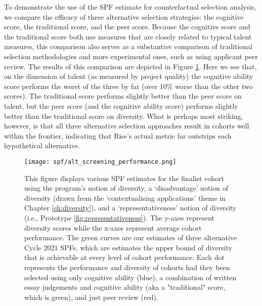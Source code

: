 To demonstrate the use of the SPF estimate for counterfactual selection analysis, we compare the efficacy of three alternative selection strategies: the cognitive score, the traditional score, and the peer score. Because the cognitive score and the traditional score both use measures that are closely related to typical talent measures, this comparison also serves as a substantive comparison of traditional selection methodologies and more experimental ones, such as using applicant peer review. The results of this comparison are depicted in Figure \ref{fig:alt_screen}. Here we see that, on the dimension of talent (as measured by project quality) the cognitive ability score performs the worst of the three by far (over $10\%$ worse than the other two scores). The traditional score performs slightly better than the peer score on talent, but the peer score (and the cognitive ability score) performs slightly better than the traditional score on diversity. What is perhaps most striking, however, is that all three alternative selection approaches result in cohorts well within the frontier, indicating that Rise's actual metric far outstrips each hypothetical alternative.

    \begin{figure}[!htb]
    \centering
    \texttt{[image: spf/alt\_screening\_performance.png]} 
    \caption{This figure displays various SPF estimates for the  finalist cohort using the program's notion of diversity, a `disadvantage' notion of diversity (drawn from the `contextualising applications' theme in Chapter \ref{ch:diversity}), and a `representativeness' notion of diversity (i.e., Prototype \ref{fig:representativeness}). The y-axes represent diversity scores while the x-axes represent average cohort performance. The green curves are our estimates of three alternative Cycle 2021 SPFs, which are estimates the upper bound of diversity that is achievable at every level of cohort performance. Each dot represents the performance and diversity of cohorts had they been selected using only cognitive ability (blue), a combination of written essay judgements and cognitive ability (aka a "traditional" score, which is green), and just peer review (red).} \label{fig:alt_screen}
    \end{figure}

